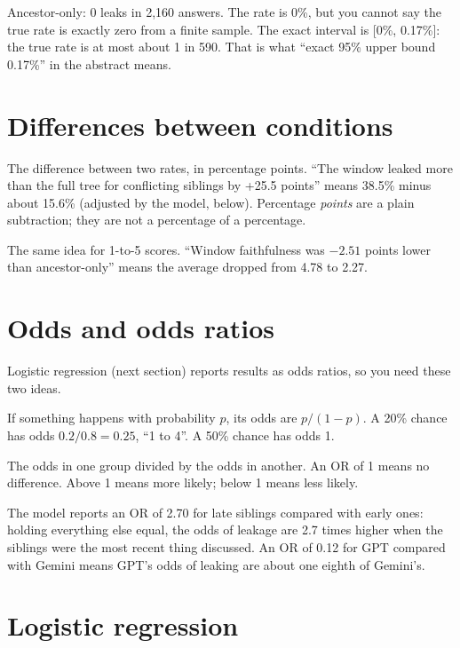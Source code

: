 \begin{example}
Ancestor-only: 0 leaks in 2,160 answers. The rate is 0\%, but you cannot say the true rate is exactly zero from a finite sample. The exact interval is [0\%, 0.17\%]: the true rate is at most about 1 in 590. That is what ``exact 95\% upper bound 0.17\%'' in the abstract means.
\end{example}

\section{Differences between conditions}

 The difference between two rates, in percentage points. ``The window leaked more than the full tree for conflicting siblings by +25.5 points'' means 38.5\% minus about 15.6\% (adjusted by the model, below). Percentage \emph{points} are a plain subtraction; they are not a percentage of a percentage.

 The same idea for 1-to-5 scores. ``Window faithfulness was $-2.51$ points lower than ancestor-only'' means the average dropped from 4.78 to 2.27.

\section{Odds and odds ratios}

Logistic regression (next section) reports results as odds ratios, so you need these two ideas.

 If something happens with probability $p$, its odds are $p / (1 - p)$. A 20\% chance has odds $0.2 / 0.8 = 0.25$, ``1 to 4''. A 50\% chance has odds 1.

 The odds in one group divided by the odds in another. An OR of 1 means no difference. Above 1 means more likely; below 1 means less likely.

\begin{example}
The model reports an OR of 2.70 for late siblings compared with early ones: holding everything else equal, the odds of leakage are 2.7 times higher when the siblings were the most recent thing discussed. An OR of 0.12 for GPT compared with Gemini means GPT's odds of leaking are about one eighth of Gemini's.
\end{example}

\section{Logistic regression}

